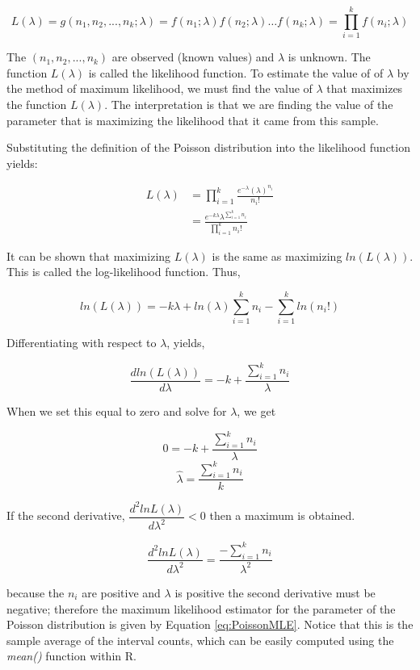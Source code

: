 \documentclass[
]{book}
\theoremstyle{definition}
\theoremstyle{definition}
\theoremstyle{definition}
\theoremstyle{definition}
\theoremstyle{remark}
\begin{document}
\[L(\lambda) = g(n_{1}, n_{2},...,n_{k};\lambda) = f(n_1;\lambda)f(n_2;\lambda) \ldots f(n_k;\lambda) = \prod_{i = 1}^{k} f(n_i; \lambda)\]

The \((n_{1}, n_{2},...,n_{k})\) are observed (known values) and \(\lambda\) is unknown.
The function \(L(\lambda)\) is called the likelihood function. To estimate
the value of of \(\lambda\) by the method of maximum likelihood, we must
find the value of \(\lambda\) that maximizes the function \(L(\lambda)\).
The interpretation is that we are finding the value of the parameter
that is maximizing the likelihood that it came from this sample.

Substituting the definition of the Poisson distribution into the
likelihood function yields:

\[\begin{aligned}
L(\lambda) & = \prod_{i = 1}^{k}\frac{e^{-\lambda}\left(\lambda \right)^{n_i}}{n_{i}!}\\
 & = \frac{e^{-k\lambda}\lambda^{\sum_{i=1}^{k}n_{i}}}{\prod_{i = 1}^{k}n_{i}!}\end{aligned}\]

It can be shown that maximizing \(L(\lambda)\) is the same as maximizing
\(ln(L (\lambda))\). This is called the log-likelihood function. Thus,

\[ln(L (\lambda)) = -k \lambda + ln(\lambda)\sum_{i = 1}^{k} n_i - \sum_{i = 1}^{k} ln(n_{i}!)\]

Differentiating with respect to \(\lambda\), yields,

\[\dfrac{dln(L(\lambda))}{d\lambda} = -k + \dfrac{\sum_{i = 1}^{k} n_i}{\lambda}\]

When we set this equal to zero and solve for \(\lambda\), we get

\[0 = -k + \dfrac{\sum_{i = 1}^{k} n_i}{\lambda}\]
\begin{equation}
\hat{\lambda} = \dfrac{\sum_{i = 1}^{k} n_i}{k}
\label{eq:PoissonMLE}
\end{equation}

If the second derivative, \(\dfrac{d^2lnL(\lambda)}{d\lambda^2} < 0\) then
a maximum is obtained.

\[\dfrac{d^2 lnL(\lambda)}{d \lambda^2} = \dfrac{-\sum_{i = 1}^{k} n_i}{\lambda^2}\]

because the \(n_i\) are positive and \(\lambda\) is positive the second
derivative must be negative; therefore the maximum likelihood estimator
for the parameter of the Poisson distribution is given by
Equation \eqref{eq:PoissonMLE}. Notice that this is the sample average of
the interval counts, which can be easily computed using the \emph{mean()} function within R.
\end{document}
